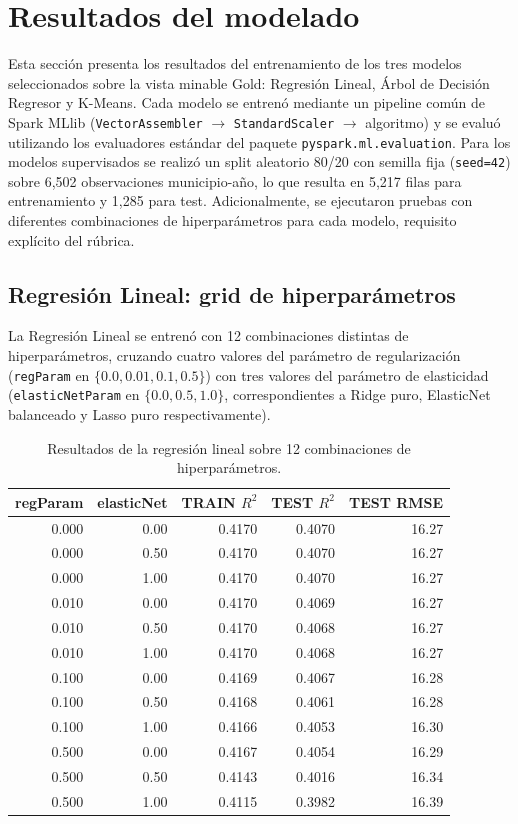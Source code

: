 \section{Resultados del modelado}
Esta sección presenta los resultados del entrenamiento de los tres modelos seleccionados sobre la vista minable Gold: Regresión Lineal, Árbol de Decisión Regresor y K-Means. Cada modelo se entrenó mediante un pipeline común de Spark MLlib (\texttt{VectorAssembler} $\rightarrow$ \texttt{StandardScaler} $\rightarrow$ algoritmo) y se evaluó utilizando los evaluadores estándar del paquete \texttt{pyspark.ml.evaluation}. Para los modelos supervisados se realizó un split aleatorio 80/20 con semilla fija (\texttt{seed=42}) sobre 6,502 observaciones municipio-año, lo que resulta en 5,217 filas para entrenamiento y 1,285 para test. Adicionalmente, se ejecutaron pruebas con diferentes combinaciones de hiperparámetros para cada modelo, requisito explícito del rúbrica.

\subsection{Regresión Lineal: grid de hiperparámetros}
La Regresión Lineal se entrenó con 12 combinaciones distintas de hiperparámetros, cruzando cuatro valores del parámetro de regularización (\texttt{regParam} en $\{0.0, 0.01, 0.1, 0.5\}$) con tres valores del parámetro de elasticidad (\texttt{elasticNetParam} en $\{0.0, 0.5, 1.0\}$, correspondientes a Ridge puro, ElasticNet balanceado y Lasso puro respectivamente).

\begin{table}[H]
\centering
\caption{Resultados de la regresión lineal sobre 12 combinaciones de hiperparámetros.}
\begin{tabular}{r r r r r}
\toprule
\textbf{regParam} & \textbf{elasticNet} & \textbf{TRAIN $R^2$} & \textbf{TEST $R^2$} & \textbf{TEST RMSE} \\
\midrule
0.000 & 0.00 & 0.4170 & 0.4070 & 16.27 \\
0.000 & 0.50 & 0.4170 & 0.4070 & 16.27 \\
0.000 & 1.00 & 0.4170 & 0.4070 & 16.27 \\
0.010 & 0.00 & 0.4170 & 0.4069 & 16.27 \\
0.010 & 0.50 & 0.4170 & 0.4068 & 16.27 \\
0.010 & 1.00 & 0.4170 & 0.4068 & 16.27 \\
0.100 & 0.00 & 0.4169 & 0.4067 & 16.28 \\
0.100 & 0.50 & 0.4168 & 0.4061 & 16.28 \\
0.100 & 1.00 & 0.4166 & 0.4053 & 16.30 \\
0.500 & 0.00 & 0.4167 & 0.4054 & 16.29 \\
0.500 & 0.50 & 0.4143 & 0.4016 & 16.34 \\
0.500 & 1.00 & 0.4115 & 0.3982 & 16.39 \\
\bottomrule
\end{tabular}
\end{table}

